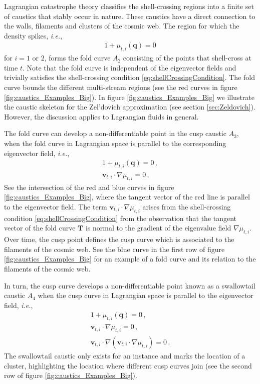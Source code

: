 \documentclass[a4paper, 11pt]{article}
\begin{document}
Lagrangian catastrophe theory classifies the shell-crossing regions into a finite set of caustics that stably occur in nature. These caustics have a direct connection to the walls, filaments and clusters of the cosmic web. The region for which the density spikes, \textit{i.e.}, 
\begin{align}
1+\mu_{t,i}(\bm{q})=0
\end{align}
for $i=1$ or $2$, forms the fold curve $A_2$ consisting of the points that shell-cross at time $t$. Note that the fold curve is independent of the eigenvector fields and trivially satisfies the shell-crossing condition \eqref{eq:shellCrossingCondition}. The fold curve bounds the different multi-stream regions (see the red curves in figure \ref{fig:caustics_Examples_Big}). In figure \ref{fig:caustics_Examples_Big} we illustrate the caustic skeleton for the Zel'dovich approximation (see section \ref{sec:Zeldovich}). However, the discussion applies to Lagrangian fluids in general.

The fold curve can develop a non-differentiable point in the cusp caustic $A_3$, when the fold curve in Lagrangian space is parallel to the corresponding eigenvector field, \textit{i.e.}, 
\begin{align}
1+\mu_{t,i}(\bm{q})=0\,,\\
\bm{v}_{t,i} \cdot \nabla \mu_{t,i}=0\,,\label{eq:cuspCondition}
\end{align}
See the intersection of the red and blue curves in figure \ref{fig:caustics_Examples_Big}, where the tangent vector of the red line is parallel to the eigenvector field. The term $\bm{v}_{t,i} \cdot \nabla \mu_{t,i}$ arises from the shell-crossing condition \eqref{eq:shellCrossingCondition} from the observation that the tangent vector of the fold curve $\bm{T}$ is normal to the gradient of the eigenvalue field $\nabla \mu_{t,i}$. Over time, the cusp point defines the cusp curve which is associated to the filaments of the cosmic web. See the blue curve in the first row of figure \ref{fig:caustics_Examples_Big} for an example of a fold curve and its relation to the filaments of the cosmic web. 

In turn, the cusp curve develops a non-differentiable point known as a swallowtail caustic $A_4$ when the cusp curve in Lagrangian space is parallel to the eigenvector field, \textit{i.e.},
\begin{align}
1+\mu_{t,i}(\bm{q})=0\,,\\
\bm{v}_{t,i} \cdot \nabla \mu_{t,i}=0\,,\\
\bm{v}_{t,i} \cdot \nabla (\bm{v}_{t,i} \cdot \nabla \mu_{t,i}) = 0\,.
\end{align}
The swallowtail caustic only exists for an instance and marks the location of a cluster, highlighting the location where different cusp curves join (see the second row of figure \ref{fig:caustics_Examples_Big}). 
\end{document}
